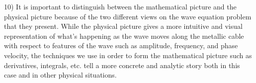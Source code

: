 \documentclass[executivepaper]{article}
\begin{document}
\begin{flushleft}

10) It is important to distinguish between the mathematical picture and the physical picture because of the two different views on the wave equation problem that they present. While the physical picture gives a more intuitive and visual representation of what's happening as the wave moves along the metallic cable with respect to features of the wave such as amplitude, frequency, and phase velocity, the techniques we use in order to form the mathematical picture such as derivatives, integrals, etc. tell a more concrete and analytic story both in this case and in other physical situations.

\end{flushleft}
\end{document}
